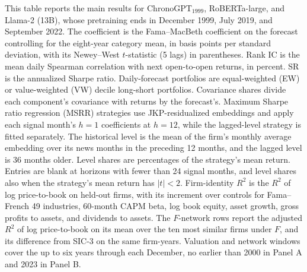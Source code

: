 \begin{table}[htbp]
\centering
\caption{Forecast, MSRR Strategy, and Valuation Results by Encoder}
\label{tab:tab10}
\begin{minipage}{\linewidth}\footnotesize
This table reports the main results for ChronoGPT$_{1999}$, RoBERTa-large, and Llama-2 (13B), whose pretraining ends in December 1999, July 2019, and September 2022. The coefficient is the Fama--MacBeth coefficient on the forecast controlling for the eight-year category mean, in basis points per standard deviation, with its Newey--West $t$-statistic (5 lags) in parentheses. Rank IC is the mean daily Spearman correlation with next open-to-open returns, in percent. SR is the annualized Sharpe ratio. Daily-forecast portfolios are equal-weighted (EW) or value-weighted (VW) decile long-short portfolios. Covariance shares divide each component's covariance with returns by the forecast's. Maximum Sharpe ratio regression (MSRR) strategies use JKP-residualized embeddings and apply each signal month's $h=1$ coefficients at $h=12$, while the lagged-level strategy is fitted separately. The historical level is the mean of the firm's monthly average embedding over its news months in the preceding 12 months, and the lagged level is 36 months older. Level shares are percentages of the strategy's mean return. Entries are blank at horizons with fewer than 24 signal months, and level shares also when the strategy's mean return has $|t|<2$. Firm-identity $R^2$ is the $R^2$ of log price-to-book on held-out firms, with its increment over controls for Fama--French 49 industries, 60-month CAPM beta, log book equity, asset growth, gross profits to assets, and dividends to assets. The $F$-network rows report the adjusted $R^2$ of log price-to-book on its mean over the ten most similar firms under $F$, and its difference from SIC-3 on the same firm-years. Valuation and network windows cover the up to six years through each December, no earlier than 2000 in Panel A and 2023 in Panel B.
\end{minipage}
\medskip


\end{table}
